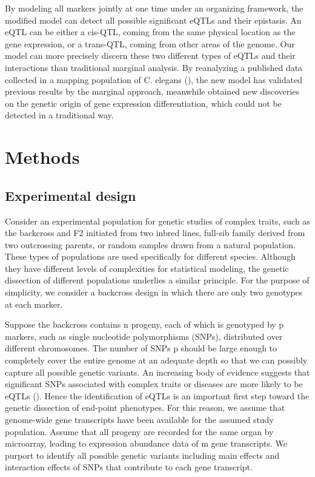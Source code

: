 \documentclass[11pt,]{book}
\theoremstyle{definition}
\theoremstyle{definition}
\theoremstyle{remark}
\begin{document}
By modeling all markers jointly at one time under an organizing
framework, the modified model can detect all possible significant eQTLs
and their epistasis. An eQTL can be either a cis-QTL, coming from the
same physical location as the gene expression, or a trans-QTL, coming
from other areas of the genome. Our model can more precisely discern
these two different types of eQTLs and their interactions than
traditional marginal analysis. By reanalyzing a published data collected
in a mapping population of C. elegans (\cite{rockman2010selection}), the
new model has validated previous results by the marginal approach,
meanwhile obtained new discoveries on the genetic origin of gene
expression differentiation, which could not be detected in a traditional
way.

\section{Methods}\label{methods}

\subsection{Experimental design}\label{experimental-design}

Consider an experimental population for genetic studies of complex
traits, such as the backcross and F2 initiated from two inbred lines,
full-sib family derived from two outcrossing parents, or random samples
drawn from a natural population. These types of populations are used
specifically for different species. Although they have different levels
of complexities for statistical modeling, the genetic dissection of
different populations underlies a similar principle. For the purpose of
simplicity, we consider a backcross design in which there are only two
genotypes at each marker.

Suppose the backcross contains n progeny, each of which is genotyped by
p markers, such as single nucleotide polymorphisms (SNPs), distributed
over different chromosomes. The number of SNPs p should be large enough
to completely cover the entire genome at an adequate depth so that we
can possibly capture all possible genetic variants. An increasing body
of evidence suggests that significant SNPs associated with complex
traits or diseases are more likely to be eQTLs (\cite{li2013using}).
Hence the identification of eQTLs is an important first step toward the
genetic dissection of end-point phenotypes. For this reason, we assume
that genome-wide gene transcripts have been available for the assumed
study population. Assume that all progeny are recorded for the same
organ by microarray, leading to expression abundance data of m gene
transcripts. We purport to identify all possible genetic variants
including main effects and interaction effects of SNPs that contribute
to each gene transcript.
\end{document}
